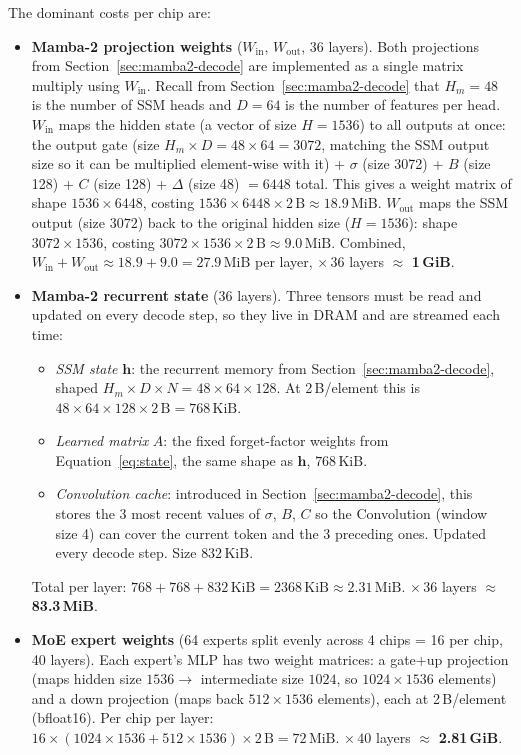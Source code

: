 The dominant costs per chip are:
\begin{itemize}
  \item \textbf{Mamba-2 projection weights} ($W_{\mathrm{in}}$, $W_{\mathrm{out}}$, 36 layers). Both projections from Section~\ref{sec:mamba2-decode} are implemented as a single matrix multiply using $W_{\mathrm{in}}$. Recall from Section~\ref{sec:mamba2-decode} that $H_m{=}48$ is the number of SSM heads and $D{=}64$ is the number of features per head. $W_{\mathrm{in}}$ maps the hidden state (a vector of size $H{=}1536$) to all outputs at once: the output gate (size $H_m{\times}D = 48{\times}64 = 3072$, matching the SSM output size so it can be multiplied element-wise with it) + $\sigma$ (size 3072) + $B$ (size 128) + $C$ (size 128) + $\Delta$ (size 48) $= 6448$ total. This gives a weight matrix of shape $1536{\times}6448$, costing $1536{\times}6448{\times}2\,\text{B} \approx 18.9\,\text{MiB}$. $W_{\mathrm{out}}$ maps the SSM output (size $3072$) back to the original hidden size ($H{=}1536$): shape $3072{\times}1536$, costing $3072{\times}1536{\times}2\,\text{B} \approx 9.0\,\text{MiB}$. Combined, $W_{\mathrm{in}} + W_{\mathrm{out}} \approx 18.9 + 9.0 = 27.9\,\text{MiB}$ per layer, $\times\,36$ layers $\approx$ \textbf{1\,GiB}.
  \item \textbf{Mamba-2 recurrent state} (36 layers). Three tensors must be read and updated on every decode step, so they live in DRAM and are streamed each time:
  \begin{itemize}
    \item \emph{SSM state} $\mathbf{h}$: the recurrent memory from Section~\ref{sec:mamba2-decode}, shaped $H_m{\times}D{\times}N = 48{\times}64{\times}128$. At 2\,B/element this is $48{\times}64{\times}128{\times}2\,\text{B} = 768\,\text{KiB}$.
    \item \emph{Learned matrix} $A$: the fixed forget-factor weights from Equation~\ref{eq:state}, the same shape as $\mathbf{h}$, $768\,\text{KiB}$.
    \item \emph{Convolution cache}: introduced in Section~\ref{sec:mamba2-decode}, this stores the 3 most recent values of $\sigma$, $B$, $C$ so the Convolution (window size 4) can cover the current token and the 3 preceding ones. Updated every decode step. Size $832\,\text{KiB}$.
  \end{itemize}
  Total per layer: $768 + 768 + 832\,\text{KiB} = 2368\,\text{KiB} \approx 2.31\,\text{MiB}$. $\times\,36$ layers $\approx$ \textbf{83.3\,MiB}.
  \item \textbf{MoE expert weights} (64 experts split evenly across 4 chips = 16 per chip, 40 layers). Each expert's MLP has two weight matrices: a gate+up projection (maps hidden size $1536 \to$ intermediate size $1024$, so $1024{\times}1536$ elements) and a down projection (maps back $512{\times}1536$ elements), each at 2\,B/element (bfloat16). Per chip per layer: $16{\times}(1024{\times}1536 + 512{\times}1536){\times}2\,\text{B} = 72\,\text{MiB}$. $\times\,40$ layers $\approx$ \textbf{2.81\,GiB}.
\end{itemize}

